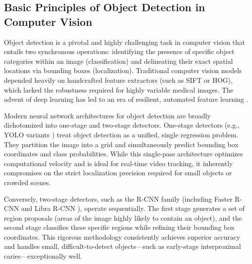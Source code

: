 \subsection{Basic Principles of Object Detection in Computer Vision}
\par Object detection is a pivotal and highly challenging task in computer vision that entails two synchronous operations: identifying the presence of specific object categories within an image (classification) and delineating their exact spatial locations via bounding boxes (localization). Traditional computer vision models depended heavily on handcrafted feature extractors (such as SIFT or HOG), which lacked the robustness required for highly variable medical images. The advent of deep learning has led to an era of resilient, automated feature learning \cite{xie2023survey}.
\par Modern neural network architectures for object detection are broadly dichotomized into one-stage and two-stage detectors. One-stage detectors (e.g., YOLO variants \cite{redmon2016you}) treat object detection as a unified, single regression problem. They partition the image into a grid and simultaneously predict bounding box coordinates and class probabilities. While this single-pass architecture optimizes computational velocity and is ideal for real-time video tracking, it inherently compromises on the strict localization precision required for small objects or crowded scenes.
\par Conversely, two-stage detectors, such as the R-CNN family (including Faster R-CNN \cite{kim2020automated} and Libra R-CNN \cite{pang2019libra}), operate sequentially. The first stage generates a set of region proposals (areas of the image highly likely to contain an object), and the second stage classifies these specific regions while refining their bounding box coordinates. This rigorous methodology consistently achieves superior accuracy and handles small, difficult-to-detect objects—such as early-stage interproximal caries—exceptionally well.

